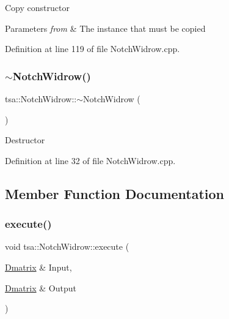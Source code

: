 Copy constructor


\begin{DoxyParams}{Parameters}
{\em from} & The instance that must be copied \\
\hline
\end{DoxyParams}


Definition at line 119 of file Notch\+Widrow.\+cpp.

\mbox{\label{classtsa_1_1_notch_widrow_a6001ad30b1394347df1be5d9a77a46de}} 
\subsubsection{\texorpdfstring{$\sim$\+Notch\+Widrow()}{~NotchWidrow()}}
{\footnotesize\ttfamily tsa\+::\+Notch\+Widrow\+::$\sim$\+Notch\+Widrow (\begin{DoxyParamCaption}{ }\end{DoxyParamCaption})\hspace{0.3cm}{\ttfamily [virtual]}}

Destructor 

Definition at line 32 of file Notch\+Widrow.\+cpp.



\subsection{Member Function Documentation}
\mbox{\label{classtsa_1_1_notch_widrow_a40d73f3abe99c4e73d392f68317298c7}} 
\subsubsection{\texorpdfstring{execute()}{execute()}}
{\footnotesize\ttfamily void tsa\+::\+Notch\+Widrow\+::execute (\begin{DoxyParamCaption}\item[{\hyperlink{namespacetsa_ad260cd21c1891c4ed391fe788569aba4}{Dmatrix} \&}]{Input,  }\item[{\hyperlink{namespacetsa_ad260cd21c1891c4ed391fe788569aba4}{Dmatrix} \&}]{Output }\end{DoxyParamCaption})}


